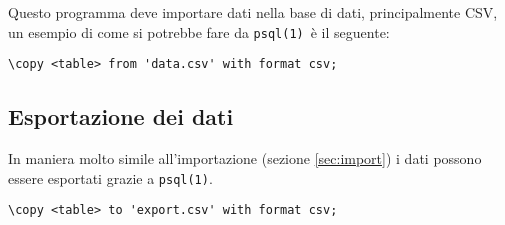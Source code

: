 \documentclass[draft]{article}
\newcommand{\psql}{\texttt{psql(1)}}
\begin{document}
Questo programma deve importare dati nella base di dati, principalmente CSV, un
esempio di come si potrebbe fare da \psql\ è il seguente:

\begin{verbatim}
\copy <table> from 'data.csv' with format csv;
\end{verbatim}

\subsection{Esportazione dei dati}

In maniera molto simile all'importazione (sezione \ref{sec:import}) i dati
possono essere esportati grazie a \psql.

\begin{verbatim}
\copy <table> to 'export.csv' with format csv;
\end{verbatim}



\end{document}

